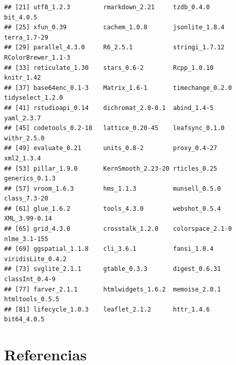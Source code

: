\documentclass[spanish]{article}
\begin{document}
\begin{verbatim}
## [21] utf8_1.2.3         rmarkdown_2.21     tzdb_0.4.0         bit_4.0.5         
## [25] xfun_0.39          cachem_1.0.8       jsonlite_1.8.4     terra_1.7-29      
## [29] parallel_4.3.0     R6_2.5.1           stringi_1.7.12     RColorBrewer_1.1-3
## [33] reticulate_1.30    stars_0.6-2        Rcpp_1.0.10        knitr_1.42        
## [37] base64enc_0.1-3    Matrix_1.6-1       timechange_0.2.0   tidyselect_1.2.0  
## [41] rstudioapi_0.14    dichromat_2.0-0.1  abind_1.4-5        yaml_2.3.7        
## [45] codetools_0.2-18   lattice_0.20-45    leafsync_0.1.0     withr_2.5.0       
## [49] evaluate_0.21      units_0.8-2        proxy_0.4-27       xml2_1.3.4        
## [53] pillar_1.9.0       KernSmooth_2.23-20 rticles_0.25       generics_0.1.3    
## [57] vroom_1.6.3        hms_1.1.3          munsell_0.5.0      class_7.3-20      
## [61] glue_1.6.2         tools_4.3.0        webshot_0.5.4      XML_3.99-0.14     
## [65] grid_4.3.0         crosstalk_1.2.0    colorspace_2.1-0   nlme_3.1-155      
## [69] ggspatial_1.1.8    cli_3.6.1          fansi_1.0.4        viridisLite_0.4.2 
## [73] svglite_2.1.1      gtable_0.3.3       digest_0.6.31      classInt_0.4-9    
## [77] farver_2.1.1       htmlwidgets_1.6.2  memoise_2.0.1      htmltools_0.5.5   
## [81] lifecycle_1.0.3    leaflet_2.1.2      httr_1.4.6         bit64_4.0.5
\end{verbatim}

\hypertarget{referencias}{%
\section*{Referencias}\label{referencias}}
\end{document}
